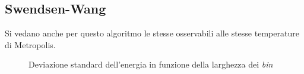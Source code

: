 \subsection*{Swendsen-Wang}
Si vedano anche per questo algoritmo le stesse osservabili alle stesse temperature di Metropolis. 
\begin{figure}[h!]
\caption{Deviazione standard dell'energia in funzione della larghezza dei \emph{bin} }
\end{figure}
